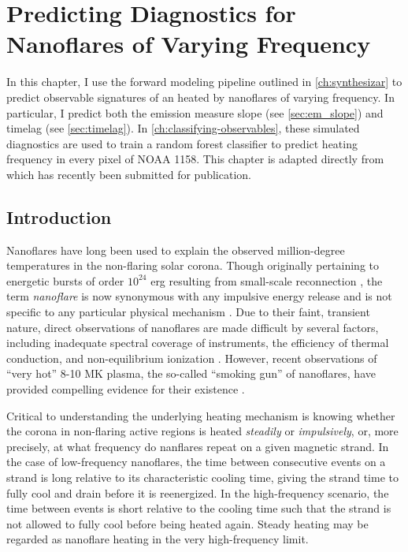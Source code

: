 \chapter{Predicting Diagnostics for Nanoflares of Varying Frequency}\label{ch:modeling-observables}

In this chapter, I use the forward modeling pipeline outlined in \autoref{ch:synthesizar} to predict observable signatures of an \AR{} heated by nanoflares of varying frequency. In particular, I predict both the emission measure slope (see \autoref{sec:em_slope}) and timelag (see \autoref{sec:timelag}). In \autoref{ch:classifying-observables}, these simulated diagnostics are used to train a random forest classifier to predict heating frequency in every pixel of \AR{} NOAA 1158. This chapter is adapted directly from \citet{barnes_understanding_2019} which has recently been submitted for publication. 

\section{Introduction}\label{sec:modeling-observables:introduction}

Nanoflares have long been used to explain the observed million-degree temperatures in the non-flaring solar corona. Though originally pertaining to energetic bursts of order $10^{24}$ erg resulting from small-scale reconnection \citep{parker_nanoflares_1988}, the term \textit{nanoflare} is now synonymous with any impulsive energy release and is not specific to any particular physical mechanism \citep{klimchuk_key_2015}. Due to their faint, transient nature, direct observations of nanoflares are made difficult by several factors, including inadequate spectral coverage of instruments, the efficiency of thermal conduction, and non-equilibrium ionization \citep{cargill_implications_1994,winebarger_defining_2012,barnes_inference_2016}. However, recent observations of ``very hot'' 8-10 MK plasma, the so-called ``smoking gun'' of nanoflares, have provided compelling evidence for their existence \citep[e.g.][]{brosius_pervasive_2014,caspi_new_2015,parenti_spectroscopy_2017,ishikawa_detection_2017}.

Critical to understanding the underlying heating mechanism is knowing whether the corona in non-flaring active regions is heated \textit{steadily} or \textit{impulsively}, or, more precisely, at what frequency do nanflares repeat on a given magnetic strand. In the case of low-frequency nanoflares, the time between consecutive events on a strand is long relative to its characteristic cooling time, giving the strand time to fully cool and drain before it is reenergized. In the high-frequency scenario, the time between events is short relative to the cooling time such that the strand is not allowed to fully cool before being heated again. Steady heating may be regarded as nanoflare heating in the very high-frequency limit.

